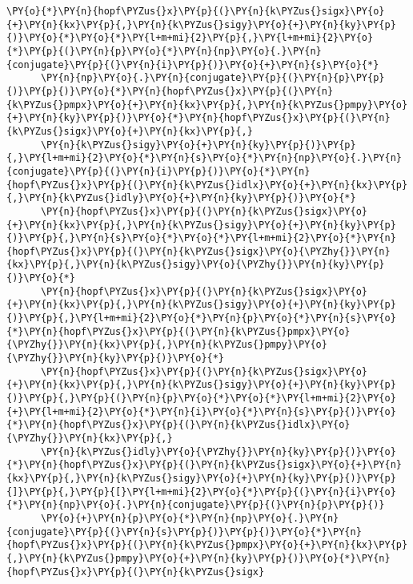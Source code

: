 \begin{Verbatim}[commandchars=\\\{\}]
      \PY{o}{*}\PY{n}{hopf\PYZus{}x}\PY{p}{(}\PY{n}{k\PYZus{}sigx}\PY{o}{+}\PY{n}{kx}\PY{p}{,}\PY{n}{k\PYZus{}sigy}\PY{o}{+}\PY{n}{ky}\PY{p}{)}\PY{o}{*}\PY{o}{*}\PY{l+m+mi}{2}\PY{p}{,}\PY{l+m+mi}{2}\PY{o}{*}\PY{p}{(}\PY{n}{p}\PY{o}{*}\PY{n}{np}\PY{o}{.}\PY{n}{conjugate}\PY{p}{(}\PY{n}{i}\PY{p}{)}\PY{o}{+}\PY{n}{s}\PY{o}{*}
      \PY{n}{np}\PY{o}{.}\PY{n}{conjugate}\PY{p}{(}\PY{n}{p}\PY{p}{)}\PY{p}{)}\PY{o}{*}\PY{n}{hopf\PYZus{}x}\PY{p}{(}\PY{n}{k\PYZus{}pmpx}\PY{o}{+}\PY{n}{kx}\PY{p}{,}\PY{n}{k\PYZus{}pmpy}\PY{o}{+}\PY{n}{ky}\PY{p}{)}\PY{o}{*}\PY{n}{hopf\PYZus{}x}\PY{p}{(}\PY{n}{k\PYZus{}sigx}\PY{o}{+}\PY{n}{kx}\PY{p}{,}
      \PY{n}{k\PYZus{}sigy}\PY{o}{+}\PY{n}{ky}\PY{p}{)}\PY{p}{,}\PY{l+m+mi}{2}\PY{o}{*}\PY{n}{s}\PY{o}{*}\PY{n}{np}\PY{o}{.}\PY{n}{conjugate}\PY{p}{(}\PY{n}{i}\PY{p}{)}\PY{o}{*}\PY{n}{hopf\PYZus{}x}\PY{p}{(}\PY{n}{k\PYZus{}idlx}\PY{o}{+}\PY{n}{kx}\PY{p}{,}\PY{n}{k\PYZus{}idly}\PY{o}{+}\PY{n}{ky}\PY{p}{)}\PY{o}{*}
      \PY{n}{hopf\PYZus{}x}\PY{p}{(}\PY{n}{k\PYZus{}sigx}\PY{o}{+}\PY{n}{kx}\PY{p}{,}\PY{n}{k\PYZus{}sigy}\PY{o}{+}\PY{n}{ky}\PY{p}{)}\PY{p}{,}\PY{n}{s}\PY{o}{*}\PY{o}{*}\PY{l+m+mi}{2}\PY{o}{*}\PY{n}{hopf\PYZus{}x}\PY{p}{(}\PY{n}{k\PYZus{}sigx}\PY{o}{\PYZhy{}}\PY{n}{kx}\PY{p}{,}\PY{n}{k\PYZus{}sigy}\PY{o}{\PYZhy{}}\PY{n}{ky}\PY{p}{)}\PY{o}{*}
      \PY{n}{hopf\PYZus{}x}\PY{p}{(}\PY{n}{k\PYZus{}sigx}\PY{o}{+}\PY{n}{kx}\PY{p}{,}\PY{n}{k\PYZus{}sigy}\PY{o}{+}\PY{n}{ky}\PY{p}{)}\PY{p}{,}\PY{l+m+mi}{2}\PY{o}{*}\PY{n}{p}\PY{o}{*}\PY{n}{s}\PY{o}{*}\PY{n}{hopf\PYZus{}x}\PY{p}{(}\PY{n}{k\PYZus{}pmpx}\PY{o}{\PYZhy{}}\PY{n}{kx}\PY{p}{,}\PY{n}{k\PYZus{}pmpy}\PY{o}{\PYZhy{}}\PY{n}{ky}\PY{p}{)}\PY{o}{*}
      \PY{n}{hopf\PYZus{}x}\PY{p}{(}\PY{n}{k\PYZus{}sigx}\PY{o}{+}\PY{n}{kx}\PY{p}{,}\PY{n}{k\PYZus{}sigy}\PY{o}{+}\PY{n}{ky}\PY{p}{)}\PY{p}{,}\PY{p}{(}\PY{n}{p}\PY{o}{*}\PY{o}{*}\PY{l+m+mi}{2}\PY{o}{+}\PY{l+m+mi}{2}\PY{o}{*}\PY{n}{i}\PY{o}{*}\PY{n}{s}\PY{p}{)}\PY{o}{*}\PY{n}{hopf\PYZus{}x}\PY{p}{(}\PY{n}{k\PYZus{}idlx}\PY{o}{\PYZhy{}}\PY{n}{kx}\PY{p}{,}
      \PY{n}{k\PYZus{}idly}\PY{o}{\PYZhy{}}\PY{n}{ky}\PY{p}{)}\PY{o}{*}\PY{n}{hopf\PYZus{}x}\PY{p}{(}\PY{n}{k\PYZus{}sigx}\PY{o}{+}\PY{n}{kx}\PY{p}{,}\PY{n}{k\PYZus{}sigy}\PY{o}{+}\PY{n}{ky}\PY{p}{)}\PY{p}{]}\PY{p}{,}\PY{p}{[}\PY{l+m+mi}{2}\PY{o}{*}\PY{p}{(}\PY{n}{i}\PY{o}{*}\PY{n}{np}\PY{o}{.}\PY{n}{conjugate}\PY{p}{(}\PY{n}{p}\PY{p}{)}
      \PY{o}{+}\PY{n}{p}\PY{o}{*}\PY{n}{np}\PY{o}{.}\PY{n}{conjugate}\PY{p}{(}\PY{n}{s}\PY{p}{)}\PY{p}{)}\PY{o}{*}\PY{n}{hopf\PYZus{}x}\PY{p}{(}\PY{n}{k\PYZus{}pmpx}\PY{o}{+}\PY{n}{kx}\PY{p}{,}\PY{n}{k\PYZus{}pmpy}\PY{o}{+}\PY{n}{ky}\PY{p}{)}\PY{o}{*}\PY{n}{hopf\PYZus{}x}\PY{p}{(}\PY{n}{k\PYZus{}sigx}

\end{Verbatim}
